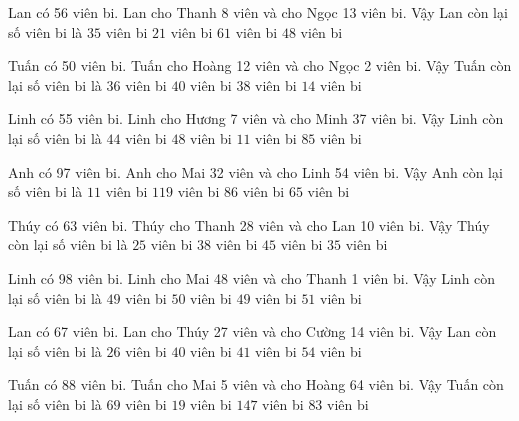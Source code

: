 \documentclass[12pt,a4paper]{article}
\begin{document}
\begin{ex}
Lan có 56 viên bi. Lan cho Thanh 8 viên và cho Ngọc 13 viên bi. Vậy Lan còn lại số viên bi là
 \choice 
{\True $35$ viên bi}
{$21$ viên bi}
{$61$ viên bi}
{$48$ viên bi}
\end{ex}
\begin{ex}
Tuấn có 50 viên bi. Tuấn cho Hoàng 12 viên và cho Ngọc 2 viên bi. Vậy Tuấn còn lại số viên bi là
 \choice 
{\True $36$ viên bi}
{$40$ viên bi}
{$38$ viên bi}
{$14$ viên bi}
\end{ex}
\begin{ex}
Linh có 55 viên bi. Linh cho Hương 7 viên và cho Minh 37 viên bi. Vậy Linh còn lại số viên bi là
 \choice 
{$44$ viên bi}
{$48$ viên bi}
{\True $11$ viên bi}
{$85$ viên bi}
\end{ex}
\begin{ex}
Anh có 97 viên bi. Anh cho Mai 32 viên và cho Linh 54 viên bi. Vậy Anh còn lại số viên bi là
 \choice 
{\True $11$ viên bi}
{$119$ viên bi}
{$86$ viên bi}
{$65$ viên bi}
\end{ex}
\begin{ex}
Thúy có 63 viên bi. Thúy cho Thanh 28 viên và cho Lan 10 viên bi. Vậy Thúy còn lại số viên bi là
 \choice 
{\True $25$ viên bi}
{$38$ viên bi}
{$45$ viên bi}
{$35$ viên bi}
\end{ex}
\begin{ex}
Linh có 98 viên bi. Linh cho Mai 48 viên và cho Thanh 1 viên bi. Vậy Linh còn lại số viên bi là
 \choice 
{\True $49$ viên bi}
{$50$ viên bi}
{\True $49$ viên bi}
{$51$ viên bi}
\end{ex}
\begin{ex}
Lan có 67 viên bi. Lan cho Thúy 27 viên và cho Cường 14 viên bi. Vậy Lan còn lại số viên bi là
 \choice 
{\True $26$ viên bi}
{$40$ viên bi}
{$41$ viên bi}
{$54$ viên bi}
\end{ex}
\begin{ex}
Tuấn có 88 viên bi. Tuấn cho Mai 5 viên và cho Hoàng 64 viên bi. Vậy Tuấn còn lại số viên bi là
 \choice 
{$69$ viên bi}
{\True $19$ viên bi}
{$147$ viên bi}
{$83$ viên bi}
\end{ex}
\end{document}
